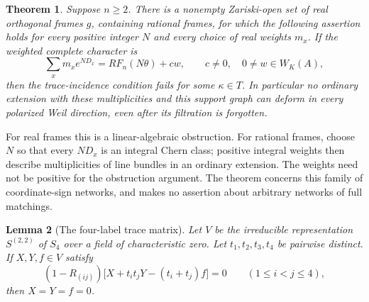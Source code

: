 \documentclass[11pt]{article}
\newtheorem{theorem}{Theorem}[section]
\newtheorem{lemma}[theorem]{Lemma}
\theoremstyle{definition}
\theoremstyle{remark}
\begin{document}
\begin{theorem}\label{thm:sign-cube-obstruction-strengthened}
Suppose \(n\ge2\).  There is a nonempty Zariski-open set of real
orthogonal frames \(g\), containing rational frames, for which the
following assertion holds for every positive integer \(N\) and every
choice of real weights \(m_x\).  If the weighted complete character is
\[
 \sum_x m_x e^{ND_x}=R F_n(N\theta)+cw,
 \qquad c\ne0,\quad 0\ne w\in W_K(A),
\]
then the trace-incidence condition fails for some \(\kappa\in T\).
In particular no ordinary extension with these multiplicities and
this support graph can deform in every polarized Weil direction,
even after its filtration is forgotten.
\end{theorem}

For real frames this is a linear-algebraic obstruction.  For rational
frames, choose \(N\) so that every \(ND_x\) is an integral Chern class;
positive integral weights then describe multiplicities of line bundles
in an ordinary extension.  The weights need not be positive for the
obstruction argument.  The theorem concerns this family of coordinate-sign networks,
and makes no assertion about arbitrary networks of full matchings.

\begin{lemma}[The four-label trace matrix]
\label{lem:four-label-trace-matrix}
Let $V$ be the irreducible representation $S^{(2,2)}$ of $S_4$ over a
field of characteristic zero.  Let $t_1,t_2,t_3,t_4$ be pairwise distinct.
If $X,Y,f\in V$ satisfy
\[
 (1-R_{(ij)})\bigl[X+t_it_jY-(t_i+t_j)f\bigr]=0
 \qquad(1\leq i<j\leq4),
\]
then $X=Y=f=0$.
\end{lemma}
\end{document}
